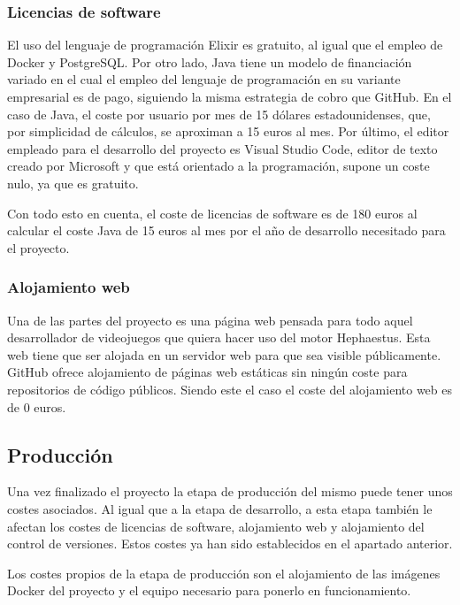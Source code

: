 \subsubsection{Licencias de software}

El uso del lenguaje de programación Elixir es gratuito, al igual que el empleo de Docker y PostgreSQL. Por otro lado, Java tiene un modelo de financiación variado en el cual el empleo del lenguaje de programación en su variante empresarial es de pago, siguiendo la misma estrategia de cobro que GitHub. En el caso de Java, el coste por usuario por mes de 15 dólares estadounidenses, que, por simplicidad de cálculos, se aproximan a 15 euros al mes. Por último, el editor empleado para el desarrollo del proyecto es Visual Studio Code, editor de texto creado por Microsoft y que está orientado a la programación, supone un coste nulo, ya que es gratuito.

Con todo esto en cuenta, el coste de licencias de software es de 180 euros al calcular el coste Java de 15 euros al mes por el año de desarrollo necesitado para el proyecto.

\subsubsection{Alojamiento web}

Una de las partes del proyecto es una página web pensada para todo aquel desarrollador de videojuegos que quiera hacer uso del motor Hephaestus. Esta web tiene que ser alojada en un servidor web para que sea visible públicamente. GitHub ofrece alojamiento de páginas web estáticas sin ningún coste para repositorios de código públicos. Siendo este el caso el coste del alojamiento web es de 0 euros.

\subsection{Producción}

Una vez finalizado el proyecto la etapa de producción del mismo puede tener unos costes asociados. Al igual que a la etapa de desarrollo, a esta etapa también le afectan los costes de licencias de software, alojamiento web y alojamiento del control de versiones. Estos costes ya han sido establecidos en el apartado anterior.

Los costes propios de la etapa de producción son el alojamiento de las imágenes Docker del proyecto y el equipo necesario para ponerlo en funcionamiento.

